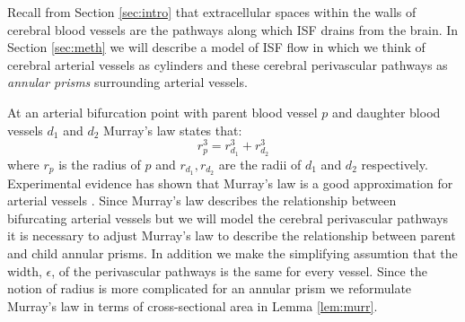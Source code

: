 \documentclass[10pt]{amsart} %
\theoremstyle{definition}
\begin{document}
Recall from Section \ref{sec:intro} that extracellular spaces within the walls of cerebral blood vessels are the pathways along which 
ISF drains from the brain. In Section \ref{sec:meth} we will describe a model of ISF flow in which we think of cerebral 
arterial vessels as cylinders and these cerebral perivascular pathways as \emph{annular prisms} surrounding arterial vessels.  

At an arterial bifurcation point with parent blood vessel $p$ and daughter blood vessels $d_{1}$ and $d_2$ Murray's 
law \cite{Murray} 
states that:
\[r_{p}^{3} = r_{d_{1}}^{3} + r_{d_{2}}^{3}\]
where $r_{p}$ is the radius of $p$ and $r_{d_{1}},r_{d_{2}}$ are the radii of $d_{1}$ and 
$d_{2}$ respectively.  Experimental evidence has shown that Murray's law is a good approximation for 
arterial vessels \cite{Zamir,cohn}.  Since Murray's law describes the relationship between bifurcating arterial vessels  
but we will model the cerebral perivascular pathways it is necessary to adjust Murray's law to describe 
the relationship between parent and child annular prisms. In addition we make the simplifying assumtion that the width,
$\epsilon$, of the perivascular pathways is the same for every vessel. Since the notion of radius is more 
complicated for an annular prism we reformulate Murray's law in terms of cross-sectional area in Lemma \ref{lem:murr}.   
\end{document}
